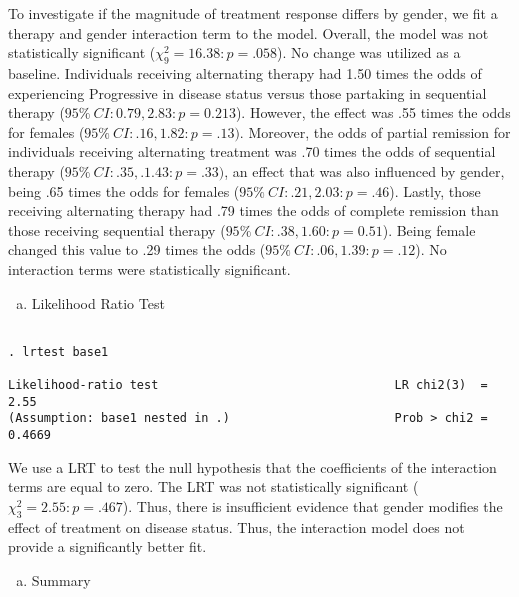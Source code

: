 \documentclass{article}
\begin{document}
To investigate if the magnitude of treatment response differs by gender, we fit a therapy and gender interaction term to the model. Overall, the model was not statistically significant ($\chi^2_9 = 16.38: p = .058$). No change was utilized as a baseline. Individuals receiving alternating therapy had 1.50 times the odds of experiencing Progressive in disease status versus those partaking in sequential therapy ($95\%\ CI: 0.79, 2.83: p =0.213$). However, the effect was .55 times the odds for females ($95\%\ CI: .16, 1.82: p =.13)$. Moreover, the odds of partial remission for individuals receiving alternating treatment was .70 times the odds of sequential therapy ($95\%\ CI: .35, .1.43: p = .33)$, an effect that was also influenced by gender, being .65 times the odds for females ($95 \%\ CI: .21, 2.03: p=.46$). Lastly, those receiving alternating therapy had .79 times the odds of complete remission than those receiving sequential therapy ($95\%\ CI: .38, 1.60: p= 0.51$). Being female changed this value to .29 times the odds ($95 \%\ CI: .06, 1.39: p =.12$). No interaction terms were statistically significant.


\begin{enumerate}[d.]
\item Likelihood Ratio Test
\end{enumerate}

\begin{verbatim}
    
. lrtest base1

Likelihood-ratio test                                 LR chi2(3)  =      2.55
(Assumption: base1 nested in .)                       Prob > chi2 =    0.4669

\end{verbatim}

We use a LRT to test the null hypothesis that the coefficients of the interaction terms are equal to zero. The LRT was not statistically significant ($\chi^2_3 = 2.55: p=.467$). Thus, there is insufficient evidence that gender modifies the effect of treatment on disease status. Thus, the interaction model does not provide a significantly better fit.


\begin{enumerate}[e.]
\item Summary
\end{enumerate}
\end{document}
